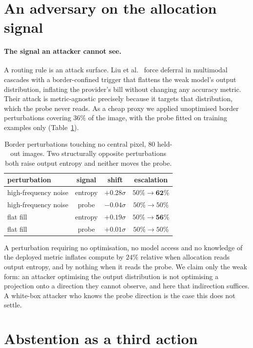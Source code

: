 \documentclass[10pt,twocolumn]{article}
\theoremstyle{plain}
\begin{document}
\section{An adversary on the allocation signal}
\paragraph{The signal an attacker cannot see.} A routing rule is an attack
surface. Liu et al.~\cite{deferral} force deferral in multimodal cascades with a
border-confined trigger that flattens the weak model's output distribution,
inflating the provider's bill without changing any accuracy metric. Their attack
is metric-agnostic precisely because it targets that distribution, which the
probe never reads. As a cheap proxy we applied unoptimised border perturbations
covering $36\%$ of the image, with the probe fitted on training examples only
(Table~\ref{tab:attack}).

\begin{table}[t]
\centering\small
\begin{tabular}{lccc}
\toprule
perturbation & signal & shift & escalation \\
\midrule
high-frequency noise & entropy & $+0.28\sigma$ & $50\% \to \mathbf{62\%}$ \\
high-frequency noise & probe   & $-0.04\sigma$ & $50\% \to 50\%$ \\
flat fill            & entropy & $+0.19\sigma$ & $50\% \to \mathbf{56\%}$ \\
flat fill            & probe   & $+0.01\sigma$ & $50\% \to 50\%$ \\
\bottomrule
\end{tabular}
\caption{Border perturbations touching no central pixel, $80$ held-out images.
Two structurally opposite perturbations both raise output entropy and neither
moves the probe.}
\label{tab:attack}
\end{table}

A perturbation requiring no optimisation, no model access and no knowledge of
the deployed metric inflates compute by $24\%$ relative when allocation reads
output entropy, and by nothing when it reads the probe. We claim only the weak
form: an attacker optimising the output distribution is not optimising a
projection onto a direction they cannot observe, and here that indirection
suffices. A white-box attacker who knows the probe direction is the case this
does not settle.


\section{Abstention as a third action}
\label{sec:abstain}
\end{document}
